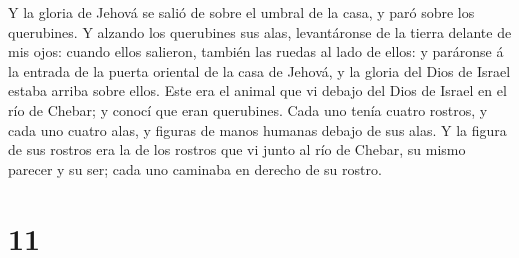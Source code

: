 Y la gloria de Jehová se salió de sobre el umbral de la casa, y paró
sobre los querubines.  Y alzando los querubines sus alas,
levantáronse de la tierra delante de mis ojos: cuando ellos salieron,
también las ruedas al lado de ellos: y paráronse á la entrada de la
puerta oriental de la casa de Jehová, y la gloria del Dios de Israel
estaba arriba sobre ellos.  Este era el animal que vi
debajo del Dios de Israel en el río de Chebar; y conocí que eran
querubines.  Cada uno tenía cuatro rostros, y cada uno
cuatro alas, y figuras de manos humanas debajo de sus alas.
 Y la figura de sus rostros era la de los rostros que vi
junto al río de Chebar, su mismo parecer y su ser; cada uno caminaba en
derecho de su rostro.

\hypertarget{section-10}{%
\section{11}\label{section-10}}

